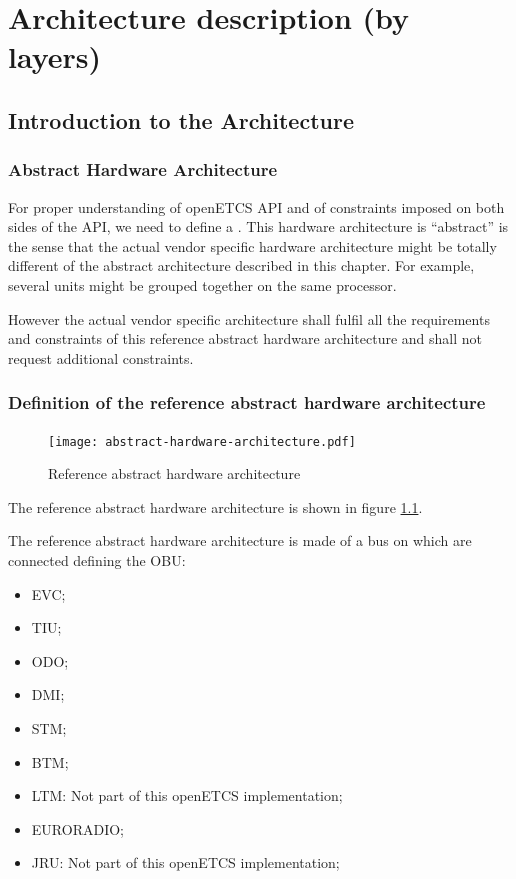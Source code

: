 \documentclass{template/openetcs_report}
\begin{document}
\chapter{Architecture description (by layers)}

\section{Introduction to the Architecture}

\subsection{Abstract Hardware Architecture}

For proper understanding of openETCS \gls{API} and of constraints imposed on
both sides of the \gls{API}, we need to define a . This hardware architecture is ``abstract''
is the sense that the actual vendor specific hardware architecture
might be totally different of the abstract architecture described in
this chapter. For example, several units might be grouped together on
the same processor.

However the actual vendor specific architecture shall fulfil all the
requirements and constraints of this reference abstract hardware
architecture and shall not request additional constraints.

\subsection{Definition of the reference abstract hardware architecture}

\begin{figure}
  \centering
  \texttt{[image: abstract-hardware-architecture.pdf]}
  \caption{Reference abstract hardware architecture}
  \label{fig:hardware-arch}
\end{figure}

The reference abstract hardware architecture is shown in figure
\ref{fig:hardware-arch}.

The reference abstract hardware architecture is made of a bus on which
are connected  defining the \gls{OBU}:

\begin{itemize}
\item \gls{EVC};
\item \gls{TIU};
\item \gls{ODO};
\item \gls{DMI};
\item \gls{STM};
\item \gls{BTM};
\item \gls{LTM}: Not part of this openETCS implementation;
\item EURORADIO;
\item \gls{JRU}: Not part of this openETCS implementation;
\end{itemize}
\end{document}
